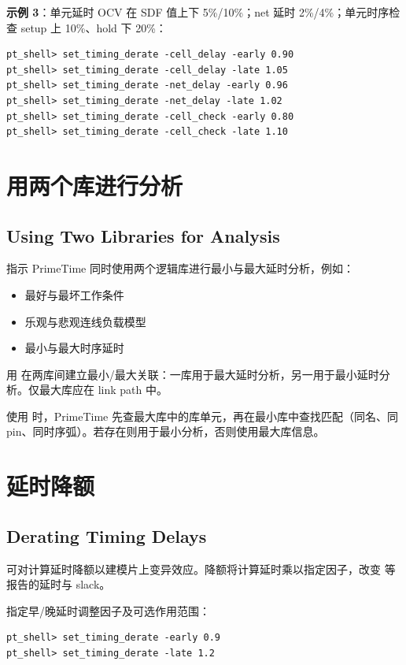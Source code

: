 \textbf{示例 3}：单元延时 OCV 在 SDF 值上下 5\%/10\%；net 延时 2\%/4\%；单元时序检查 setup 上 10\%、hold 下 20\%：
\begin{lstlisting}
pt_shell> set_timing_derate -cell_delay -early 0.90
pt_shell> set_timing_derate -cell_delay -late 1.05
pt_shell> set_timing_derate -net_delay -early 0.96
pt_shell> set_timing_derate -net_delay -late 1.02
pt_shell> set_timing_derate -cell_check -early 0.80
pt_shell> set_timing_derate -cell_check -late 1.10
\end{lstlisting}

\section{用两个库进行分析}
\subsection*{Using Two Libraries for Analysis}

 指示 PrimeTime 同时使用两个逻辑库进行最小与最大延时分析，例如：
\begin{itemize}
  \item 最好与最坏工作条件
  \item 乐观与悲观连线负载模型
  \item 最小与最大时序延时
\end{itemize}

用  在两库间建立最小/最大关联：一库用于最大延时分析，另一用于最小延时分析。仅最大库应在 link path 中。

使用  时，PrimeTime 先查最大库中的库单元，再在最小库中查找匹配（同名、同 pin、同时序弧）。若存在则用于最小分析，否则使用最大库信息。

\section{延时降额}
\subsection*{Derating Timing Delays}

可对计算延时降额以建模片上变异效应。降额将计算延时乘以指定因子，改变  等报告的延时与 slack。

 指定早/晚延时调整因子及可选作用范围：
\begin{lstlisting}
pt_shell> set_timing_derate -early 0.9
pt_shell> set_timing_derate -late 1.2
\end{lstlisting}

